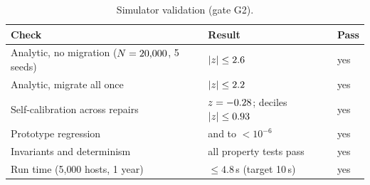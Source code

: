 \begin{table}[t]
  \centering
  \small
  \begin{tabular}{@{}lll@{}}
    \toprule
    Check & Result & Pass \\
    \midrule
    Analytic, no migration ($N = 20{,}000$, 5 seeds) & $|z| \le 2.6$ & yes \\
    Analytic, migrate all once & $|z| \le 2.2$ & yes \\
    Self-calibration across repairs & $z = -0.28$; deciles $|z| \le 0.93$ & yes \\
    Prototype regression & \VVOneCostCS{} and \VVOneCostMatched{} to $<10^{-6}$ & yes \\
    Invariants and determinism & all property tests pass & yes \\
    Run time (5{,}000 hosts, 1 year) & $\le 4.8$\,s (target 10\,s) & yes \\
    \bottomrule
  \end{tabular}
  \caption{Simulator validation (gate G2).}
  \label{tab:g2}
\end{table}
